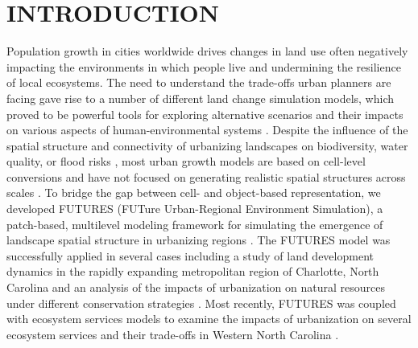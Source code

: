 \documentclass{isprs}
\begin{document}

\maketitle


\section{INTRODUCTION}\label{INTRODUCTION}

Population growth in cities worldwide drives changes in land use
often negatively impacting the environments in which people live and undermining %
the resilience of local ecosystems.
The need to understand the trade-offs urban planners are facing
gave rise to a number of different land change simulation models,
which proved to be powerful tools for exploring
alternative scenarios and their impacts on various aspects of human-environmental systems
\cite{chaudhuri2013sleuth,verburg2002modeling,sohl2007fore,waddell2002urbansim}.
Despite the influence of the spatial structure and connectivity 
of urbanizing landscapes on
biodiversity, water quality, or flood risks \cite{alberti2005effects},
most urban growth models are based on cell-level conversions and 
have not focused on generating realistic spatial structures across scales \cite{jantz2005analysis}.
To bridge the gap between cell- and object-based representation, we developed
FUTURES (FUTure Urban-Regional Environment Simulation), a patch-based, multilevel
modeling framework for simulating the emergence of landscape spatial structure
in urbanizing regions \cite{Meentemeyer2012}.
%
The FUTURES model was successfully applied in several cases 
including a study of land development dynamics in the rapidly
expanding metropolitan region of Charlotte, North Carolina \cite{Meentemeyer2012} and an analysis of the impacts
of urbanization on natural resources under different conservation strategies \cite{Dorning2015}.
Most recently, FUTURES was coupled with ecosystem services models to examine the impacts of urbanization on several
ecosystem services and their trade-offs in Western North Carolina \cite{Brian2016}.
\end{document}
